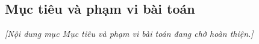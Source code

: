 
\subsection{Mục tiêu và phạm vi bài toán}\label{subsec:muc-tieu-pham-vi}

\textit{[Nội dung mục Mục tiêu và phạm vi bài toán đang chờ hoàn thiện.]}
